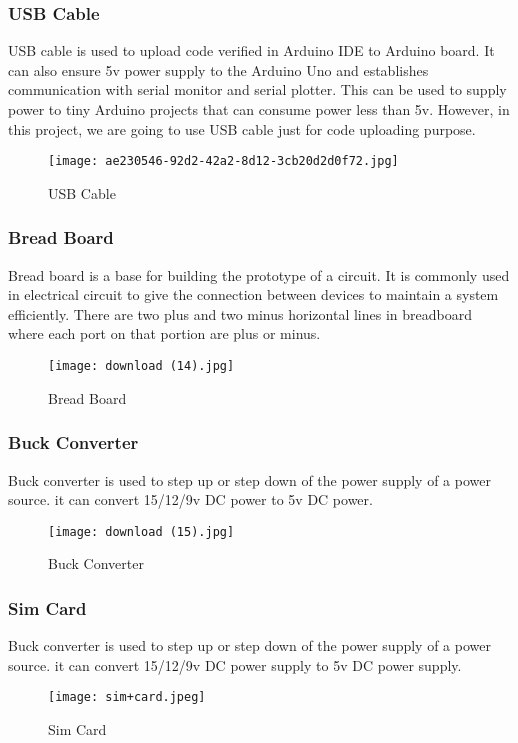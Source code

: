 \documentclass[12pt, top = 1 inch, bottom = 1 inch, left = 1.2 inch, top = .8 inch]{book}
\begin{document}
			\subsubsection{USB Cable}
			USB cable is used to upload code verified in Arduino IDE to Arduino board. It can also ensure 5v power supply to the Arduino Uno and establishes communication with serial monitor and serial plotter. This can be used to supply power to tiny Arduino projects that can consume power less than 5v. However, in this project, we are going to use USB cable just for code uploading purpose.
			\begin{figure}[h!]	
				\centering
				\texttt{[image: ae230546-92d2-42a2-8d12-3cb20d2d0f72.jpg]}
				\caption{USB Cable}
			\end{figure}
			\newpage
			\subsubsection{Bread Board}
			Bread board is a base for building the prototype of a circuit. It is commonly used in electrical circuit to give the connection between devices to maintain a system efficiently. There are two plus and two minus horizontal lines in breadboard where each port on that portion are plus or minus.  
			\begin{figure}[h!]	
				\centering
				\texttt{[image: download (14).jpg]}
				\caption{Bread Board}
			\end{figure}
			\newpage
			\subsubsection{Buck Converter}
			Buck converter is used to step up or step down of the power supply of a power source. it can convert 15/12/9v DC power to 5v DC power.  
			\begin{figure}	
				\centering
				\texttt{[image: download (15).jpg]}
				\caption{Buck Converter}
			\end{figure}
			\newpage
			\subsubsection{Sim Card}
			Buck converter is used to step up or step down of the power supply of a power source. it can convert 15/12/9v DC power supply to 5v DC power supply.  
			\begin{figure}[h!]	
				\centering
				\texttt{[image: sim+card.jpeg]}
				\caption{Sim Card}
			\end{figure}
\end{document}
